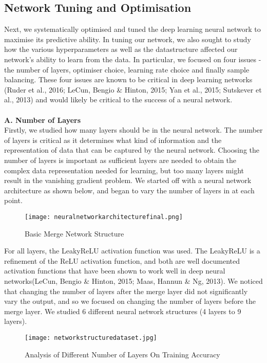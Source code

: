 \documentclass{article}
\begin{document}
\subsection{Network Tuning and Optimisation}
Next, we systematically optimised and tuned the deep learning neural network to maximise its predictive ability. In tuning our network, we also sought to study how the various hyperparameters as well as the datastructure affected our network's ability to learn from the data. In particular, we focused on four issues - the number of layers, optimiser choice, learning rate choice and finally sample balancing. These four issues are known to be critical in deep learning networks (Ruder et al., 2016; LeCun, Bengio \& Hinton, 2015; Yan et al., 2015;  Sutskever et al., 2013) and would likely be critical to the success of a neural network.\\\\
\textbf{A. Number of Layers} \\
Firstly, we studied how many layers should be in the neural network. The number of layers is critical as it determines what kind of information and the representation of data that can be captured by the neural network. Choosing the number of layers is important as sufficient layers are needed to obtain the complex data representation needed for learning, but too many layers might result in the vanishing gradient problem. We started off with a neural network architecture as shown below, and began to vary the number of layers in at each point.
\begin{figure}[H]
\texttt{[image: neuralnetworkarchitecturefinal.png]}
\centering
\caption{Basic Merge Network Structure}
\end{figure}
For all layers, the LeakyReLU activation function was used. The LeakyReLU is a refinement of the ReLU activation function, and both are well documented activation functions that have been shown to work well in deep neural networks(LeCun, Bengio \& Hinton, 2015; Maas, Hannun \& Ng, 2013). We noticed that changing the number of layers after the merge layer did not significantly vary the output, and so we focused on changing the number of layers before the merge layer. We studied 6 different neural network structures (4 layers to 9 layers). 
\begin{figure}[H]
\texttt{[image: networkstructuredataset.jpg]}
\centering
\caption{Analysis of Different Number of Layers On Training Accuracy}
\end{figure}
\end{document}
